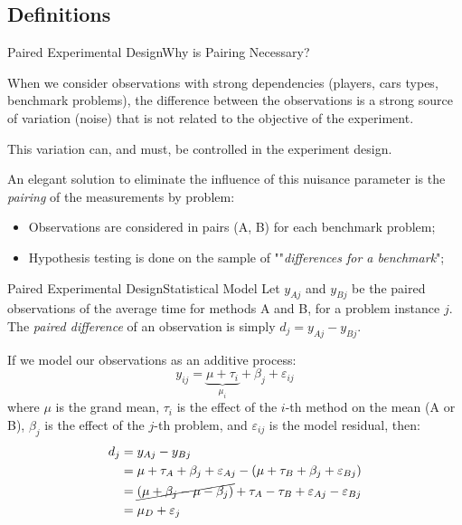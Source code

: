 \subsection{Definitions}
\begin{frame}{Paired Experimental Design}{Why is Pairing Necessary?}

  When we consider observations with strong dependencies (players, cars types, benchmark problems), the difference between the observations is a strong source of variation (noise) that is not related to the objective of the experiment.\bigskip

  This variation can, and must, be controlled in the experiment design.\bigskip

  An elegant solution to eliminate the influence of this nuisance parameter is the \textit{pairing} of the measurements by problem:\bigskip

  \begin{itemize}
  \item Observations are considered in pairs (A, B) for each benchmark problem;
  \item Hypothesis testing is done on the sample of ""\textit{differences for a benchmark}";
  \end{itemize}
\end{frame}

\begin{frame}{Paired Experimental Design}{Statistical Model}
Let $y_{Aj}$ and $y_{Bj}$ be the paired observations of the average time for methods A and B, for a problem instance $j$. The \textit{paired difference} of an observation is simply $d_j = y_{Aj} - y_{Bj}$.
\bigskip

If we model our observations as an additive process:
\begin{equation*}
y_{ij} = \underbrace{\mu + \tau_i}_{\mu_i} + \beta_j + \varepsilon_{ij}
\end{equation*}
\noindent where $\mu$ is the grand mean, $\tau_i$ is the effect of the $i$-th method on the mean (A or B), $\beta_j$ is the effect of the $j$-th problem, and $\varepsilon_{ij}$ is the model residual, then:
\begin{equation*}
\begin{split}
d_j &= y_{Aj} - y_{Bj}\\
&= \mu + \tau_A + \beta_j + \varepsilon_{Aj} - (\mu + \tau_B + \beta_j + \varepsilon_{Bj})\\
&= \cancel{\left(\mu +\beta_j - \mu - \beta_j\right)} + \tau_A-\tau_B + \varepsilon_{Aj}-\varepsilon_{Bj}\\
&=\mu_{D} + \varepsilon_j\\
\end{split}
\end{equation*}

\end{frame}

